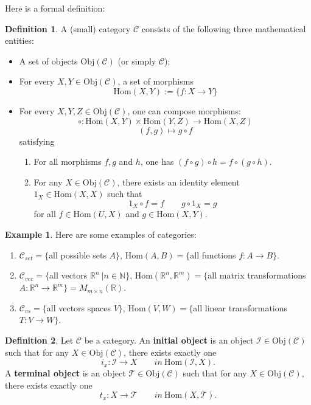 \documentclass[11pt,openany]{book}
\theoremstyle{plain}
\theoremstyle{definition}
\newtheorem{definition}[definition]{Definition}
\newtheorem{example}[example]{Example}
\theoremstyle{remark}
\begin{document}
Here is a formal definition:
\begin{definition}
    A (small) category $\mathcal {C}$ consists of the following three mathematical entities:
\begin{itemize}
\item A set of objects $\mathrm{Obj}(\mathcal{C})$ (or simply $\mathcal{C}$);
\item For every $X, Y \in \mathrm{Obj}(\mathcal{C})$, a set of morphisms  
$$\mathrm{Hom}(X,Y) := \{f: X \to Y\}$$
\item For every $X, Y, Z \in \mathrm{Obj}(\mathcal{C})$, one can compose morphisms:
$$\circ: \mathrm{Hom}(X,Y) \times \mathrm{Hom}(Y,Z) \to \mathrm{Hom}(X,Z)$$
$$(f,g) \mapsto g \circ f$$
satisfying
\begin{enumerate}
    \item For all morphisms $f, g$ and $h$, one has $(f \circ g) \circ h = f \circ (g \circ h)$.
    \item For any $X \in \mathrm{Obj}(\mathcal{C})$, there exists an identity element $1_X \in \mathrm{Hom}(X,X)$ such that
    $$1_X \circ f = f \quad \quad g \circ 1_X = g$$
    for all $f \in \mathrm{Hom}(U,X)$ and $g \in \mathrm{Hom}(X,Y)$. 
\end{enumerate}
\end{itemize}
\end{definition}

\begin{example}
Here are some examples of categories:
    \begin{enumerate}
        \item $\mathcal{C}_{set} = \{$all possible sets $A\}$, $\mathrm{Hom}(A,B) =\{$all functions $f:A \to B\}$.
        \item $\mathcal{C}_{vec} = \{$all vectors $\mathbb{R}^n\ | n \in \mathbb{N}\}$, $\mathrm{Hom}(\mathbb{R}^n,\mathbb{R}^m) =\{$all matrix transformations $A: \mathbb{R}^n \to \mathbb{R}^m\} = M_{m \times n}(\mathbb{R})$.
        \item $\mathcal{C}_{vs} = \{$all vectors spaces $V\}$, $\mathrm{Hom}(V,W) =\{$all linear transformations $T: V \to W\}$.
    \end{enumerate}
\end{example}

\begin{definition}
    Let $\mathcal{C}$ be a category. An {\bf initial object} is an object $\mathcal{I} \in \mathrm{Obj}(\mathcal{C})$ such that for any $X \in \mathrm{Obj}(\mathcal{C})$, there exists exactly one
    $$i_x: \mathcal{I} \to X  \quad \quad in\ \mathrm{Hom}(\mathcal{I},X).$$
A {\bf terminal object} is an object $\mathcal{T} \in \mathrm{Obj}(\mathcal{C})$ such that for any $X \in \mathrm{Obj}(\mathcal{C})$, there exists exactly one
    $$t_x: X \to \mathcal{T} \quad \quad in\ \mathrm{Hom}(X,\mathcal{T}).$$
\end{definition}
\end{document}
